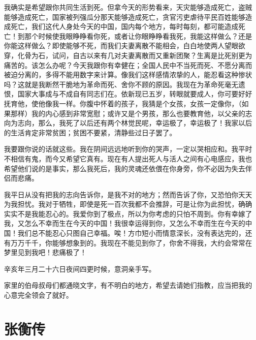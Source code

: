 \documentclass[12pt,UTF-8,openany]{ctexbook}
\begin{document}
\begin{normalsize}
    我确实是希望跟你共同生活到死。但拿今天的形势看来，天灾能够造成死亡，盗贼能够造成死亡，国家被列强瓜分那天能够造成死亡，贪官污吏虐待平民百姓能够造成死亡，我们这代人身处今天的中国，国内每个地方，每时每刻，都可能造成死亡！到那个时候使我眼睁睁看你死，或者让你眼睁睁看我死，我能这样做么？还是你能这样做么？即使能够不死，而我们夫妻离散不能相会，白白地使两人望眼欲穿，化骨为石，试问，自古以来有几对夫妻离散而又重新团聚？生离是比死别更为痛苦的。该怎么办呢？今天我跟你有幸健在；全国人民中不当死而死、不愿分离而被迫分离的，多得不能用数字来计算。像我们这样感情浓挚的人，能忍看这种惨状吗？这就是我断然干脆地为革命而死、舍你不顾的原因。我现在为革命死毫无遗恨，国家大事成与不成自有同志们在。依新现已五岁，转眼就要成人，你可要好好抚育他，使他像我一样。你腹中怀着的孩子，我猜是个女孩，女孩一定像你，（如果那样）我的内心感到非常宽慰；或许又是个男孩，那么也要教育他，以父亲的志向为志向，那么，我死了以后还有两个林觉民呢，幸运极了，幸运极了！我家以后的生活肯定非常贫困；贫困不要紧，清静些过日子罢了。
    
    我要跟你说的话就这些。我在阴间远远地听到你的哭声，一定以哭相应和。我平时不相信有鬼，而今又希望它真有。现在有人提出死人与活人之间有心电感应，我也希望他们说的是事实，那么我死后，我的灵魂还依偎在你身旁，你不必因为失去伴侣而悲痛。
    
    我平日从没有把我的志向告诉你，是我不对的地方；然而告诉了你，又恐怕你天天为我担忧。我对于牺牲，即使是死一百次我都不会推辞，可是让你为此担忧，确确实实不是我能忍心的。我爱你到了极点，所以为你考虑的只怕不周到。你有幸嫁了我，又怎么不幸而生在今天的中国！我很幸运得到你，又怎么不幸而生在今天的中国！我们总不能忍心只图自己幸福。唉！方巾短小而情意深长，没有表达完的，还有万万千千，你能够想象到的。我现在不能见到你了，你舍不得我，大约会常常在梦里见到我吧！悲痛极了！
    
    辛亥年三月二十六日夜间四更时候，意洞亲手写。
    
    家里的伯母叔母们都通晓文字，有不明白的地方，希望去请她们指教，应当把我的心意完全领会了就好。
    
\end{normalsize}



\chapter{张衡传}
\end{document}
